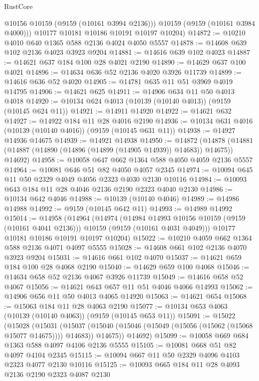 \begin{lexlean}{RustCore}
\begin{coremodule}
          @10156
          @10159
          (@9159 (@10161 @3994 @2136)))
        @10159
        (@9159 (@10161 @3984 @4000)))
      @10177
      @10181
      @10186
      @10191
      @10197
      @10204)
@14872 := @10210 @4010 @640 @1365 @588 @2136 @4024 @4050 @5557
@14878 := @14608 @639 @102 @2136 @4023 @3923 @9204
@14881 := @14616 @639 @102 @4023
@14887 := @14621 @637 @184 @100 @28 @4021 @2190
@14890 := @14629 @637 @100 @4021
@14896 := @14634 @636 @52 @2136 @4020 @3926 @11739
@14899 := @14616 @636 @52 @4020
@14905 := @14781 @635 @11 @51 @3969 @4019 @14795
@14906 := @14621 @625
@14911 := @14906 @634 @11 @50 @4013 @4018
@14920 := @10134 @624 @4013 (@10139 (@10140 @4013)) (@9159 (@10145 @624 @11))
@14921 := @14911 @14920
@14922 := @14621 @632
@14927 := @14922 @184 @11 @28 @4016 @2190
@14936 := @10134 @631 @4016 (@10139 (@10140 @4016)) (@9159 (@10145 @631 @11))
@14938 := @14927 @14936 @14675
@14939 := @14921 @14938
@14950 := @14872
    (@14878 (@14881 (@14887 (@14890 (@14896 (@14899 (@14905 @14939)) @14683)) @14675)) @14692)
@14958 := @10058 @647 @662 @1364 @588 @4050 @4059 @2136 @5557
@14964 := @10081 @646 @51 @82 @4050 @4057 @2345
@14974 := @10094 @645 @11 @50 @2329 @4049 @4056 @2323 @4030 @2130 @10116
@14984 := @10093 @643 @184 @11 @28 @4046 @2136 @2190 @2323 @4040 @2130
@14986 := @10134 @642 @4046
@14988 := @10139 (@10140 @4046)
@14989 := @14986 @14988
@14992 := @9159 (@10145 @642 @11)
@14993 := @14989 @14992
@15014 := @14958
    (@14964
      (@14974
        (@14984 @14993 @10156 @10159 (@9159 (@10161 @4041 @2136)))
        @10159
        (@9159 (@10161 @4031 @4049)))
      @10177
      @10181
      @10186
      @10191
      @10197
      @10204)
@15022 := @10210 @4059 @662 @1364 @588 @2136 @4071 @4097 @5555
@15028 := @14608 @661 @102 @2136 @4070 @3923 @9204
@15031 := @14616 @661 @102 @4070
@15037 := @14621 @659 @184 @100 @28 @4068 @2190
@15040 := @14629 @659 @100 @4068
@15046 := @14634 @658 @52 @2136 @4067 @3926 @11739
@15049 := @14616 @658 @52 @4067
@15056 := @14621 @643 @657 @11 @51 @4046 @4066 @14993
@15062 := @14906 @656 @11 @50 @4013 @4065 @14920
@15063 := @14621 @654
@15068 := @15063 @184 @11 @28 @4063 @2190
@15077 := @10134 @653 @4063 (@10139 (@10140 @4063)) (@9159 (@10145 @653 @11))
@15091 := @15022
    (@15028
      (@15031
        (@15037 (@15040 (@15046 (@15049 (@15056 (@15062 (@15068 @15077 @14675)))) @14683)) @14675))
      @14692)
@15099 := @10058 @669 @684 @1363 @588 @4097 @4106 @2136 @5555
@15105 := @10081 @668 @51 @82 @4097 @4104 @2345
@15115 := @10094 @667 @11 @50 @2329 @4096 @4103 @2323 @4077 @2130 @10116
@15125 := @10093 @665 @184 @11 @28 @4093 @2136 @2190 @2323 @4087 @2130

\end{coremodule}
\end{lexlean}
